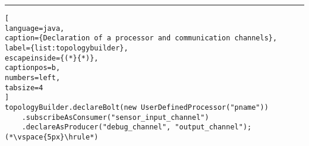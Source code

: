 \begin{small}
\vspace{8px}\hrule
\begin{lstlisting}[
language=java, 
caption={Declaration of a processor and communication channels}, 
label={list:topologybuilder}, 
escapeinside={(*}{*)}, 
captionpos=b,
numbers=left,
tabsize=4
]
topologyBuilder.declareBolt(new UserDefinedProcessor("pname"))
	.subscribeAsConsumer("sensor_input_channel")
	.declareAsProducer("debug_channel", "output_channel");(*\vspace{5px}\hrule*)
\end{lstlisting}
\end{small}
